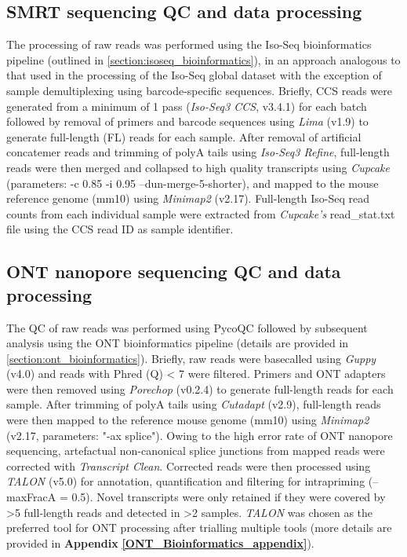 \newpage
\subsection{SMRT sequencing QC and data processing}
The processing of raw reads was performed using the Iso-Seq bioinformatics pipeline (outlined in \cref{section:isoseq_bioinformatics}), in an approach analogous to that used in the processing of the Iso-Seq global dataset with the exception of sample demultiplexing using barcode-specific sequences. Briefly, CCS reads were generated from a minimum of 1 pass (\textit{Iso-Seq3 CCS}, v3.4.1) for each batch followed by removal of primers and barcode sequences using \textit{Lima} (v1.9) to generate full-length (FL) reads for each sample. After removal of artificial concatemer reads and trimming of polyA tails using \textit{Iso-Seq3 Refine}, full-length reads were then merged and collapsed to high quality transcripts using \textit{Cupcake} (parameters: -c 0.85 -i 0.95 --dun-merge-5-shorter), and mapped to the mouse reference genome (mm10) using \textit{Minimap2} (v2.17). Full-length Iso-Seq read counts from each individual sample were extracted from \textit{Cupcake's} read\_stat.txt file using the CCS read ID as sample identifier.

\subsection{ONT nanopore sequencing QC and data processing}
The QC of raw reads was performed using PycoQC followed by subsequent analysis using the ONT bioinformatics pipeline (details are provided in \cref{section:ont_bioinformatics}). Briefly, raw reads were basecalled using \textit{Guppy} (v4.0) and reads with Phred (Q) < 7 were filtered. Primers and ONT adapters were then removed using \textit{Porechop} (v0.2.4) to generate full-length reads for each sample. After trimming of polyA tails using \textit{Cutadapt} (v2.9), full-length reads were then mapped to the reference mouse genome (mm10) using \textit{Minimap2} (v2.17, parameters: "-ax splice"). Owing to the high error rate of ONT nanopore sequencing, artefactual non-canonical splice junctions from mapped reads were corrected with \textit{Transcript Clean}. Corrected reads were then processed using \textit{TALON} (v5.0) for annotation, quantification and filtering for intrapriming (--maxFracA = 0.5). Novel transcripts were only retained if they were covered by >5 full-length reads and detected in >2 samples. \textit{TALON} was chosen as the preferred tool for ONT processing after trialling multiple tools (more details are provided in \textbf{Appendix} \textbf{\ref{ONT_Bioinformatics_appendix}}). 

